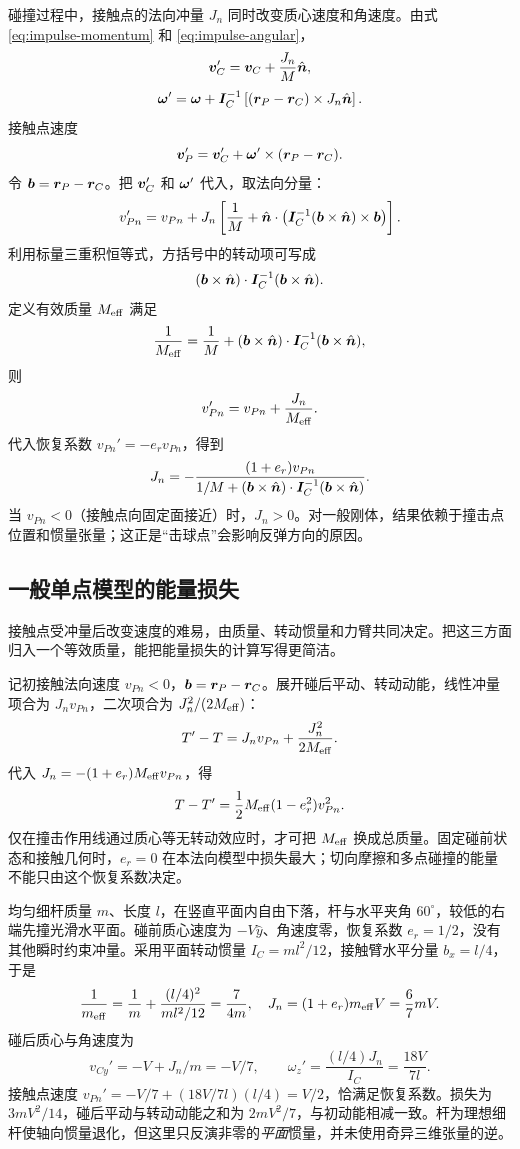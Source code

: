 碰撞过程中，接触点的法向冲量 \(J_n\) 同时改变质心速度和角速度。由式 \eqref{eq:impulse-momentum} 和 \eqref{eq:impulse-angular}，
\[
\boldsymbol{v}_C'=\boldsymbol{v}_C+\frac{J_n}{M}\hat{\boldsymbol{n}},
\]
\[
\boldsymbol{\omega}'=\boldsymbol{\omega}+\boldsymbol{I}_C^{-1}\left[(\boldsymbol{r}_P-\boldsymbol{r}_C)\times J_n\hat{\boldsymbol{n}}\right].
\]
接触点速度
\[
\boldsymbol{v}_P'=\boldsymbol{v}_C'+\boldsymbol{\omega}'\times(\boldsymbol{r}_P-\boldsymbol{r}_C).
\]
令 \(\boldsymbol{b}=\boldsymbol{r}_P-\boldsymbol{r}_C\)。把 \(\boldsymbol{v}_C'\) 和 \(\boldsymbol{\omega}'\) 代入，取法向分量：
\[
v_{Pn}'=v_{Pn}+J_n\left[
\frac1M+\hat{\boldsymbol{n}}\cdot
\left(\boldsymbol{I}_C^{-1}(\boldsymbol{b}\times\hat{\boldsymbol{n}})\times\boldsymbol{b}\right)
\right].
\]
利用标量三重积恒等式，方括号中的转动项可写成
\[
(\boldsymbol{b}\times\hat{\boldsymbol{n}})\cdot
\boldsymbol{I}_C^{-1}(\boldsymbol{b}\times\hat{\boldsymbol{n}}).
\]
定义有效质量 \(M_{\rm eff}\) 满足
\[
\frac1{M_{\rm eff}}
=\frac1M
+(\boldsymbol{b}\times\hat{\boldsymbol{n}})\cdot
\boldsymbol{I}_C^{-1}(\boldsymbol{b}\times\hat{\boldsymbol{n}}),
\]
则
\[
v_{Pn}'=v_{Pn}+\frac{J_n}{M_{\rm eff}}.
\]
代入恢复系数 \(v_{Pn}'=-e_r v_{Pn}\)，得到
\begin{equation}
J_n=-\frac{(1+e_r)v_{Pn}}{1/M
+(\boldsymbol{b}\times\hat{\boldsymbol{n}})\cdot
\boldsymbol{I}_C^{-1}(\boldsymbol{b}\times\hat{\boldsymbol{n}})}.
\label{eq:normal-impulse}
\end{equation}
当 \(v_{Pn}<0\)（接触点向固定面接近）时，\(J_n>0\)。对一般刚体，结果依赖于撞击点位置和惯量张量；这正是“击球点”会影响反弹方向的原因。

\subsection{一般单点模型的能量损失}
接触点受冲量后改变速度的难易，由质量、转动惯量和力臂共同决定。把这三方面归入一个等效质量，能把能量损失的计算写得更简洁。

记初接触法向速度 $v_{Pn}<0$，$\boldsymbol b=\boldsymbol{r}_P-\boldsymbol{r}_C$。展开碰后平动、转动动能，线性冲量项合为 $J_nv_{Pn}$，二次项合为 $J_n^2/(2M_{\rm eff})$：
\[
T'-T=J_nv_{Pn}+\frac{J_n^2}{2M_{\rm eff}}.
\]
代入 $J_n=-(1+e_r)M_{\rm eff}v_{Pn}$，得
\begin{equation}
T-T'=\frac12M_{\rm eff}(1-e_r^2)v_{Pn}^2.
\label{eq:collision-energy-loss}
\end{equation}
仅在撞击作用线通过质心等无转动效应时，才可把 $M_{\rm eff}$ 换成总质量。固定碰前状态和接触几何时，$e_r=0$ 在本法向模型中损失最大；切向摩擦和多点碰撞的能量不能只由这个恢复系数决定。

\begin{example}
均匀细杆质量 $m$、长度 $l$，在竖直平面内自由下落，杆与水平夹角 $60^\circ$，较低的右端先撞光滑水平面。碰前质心速度为 $-V\hat y$、角速度零，恢复系数 $e_r=1/2$，没有其他瞬时约束冲量。采用平面转动惯量 $I_C=ml^2/12$，接触臂水平分量 $b_x=l/4$，于是
\[
\frac1{m_{\rm eff}}=\frac1m+\frac{(l/4)^2}{ml^2/12}=\frac7{4m},\quad
J_n=(1+e_r)m_{\rm eff}V=\frac67mV.
\]
碰后质心与角速度为
\[
v_{Cy}'=-V+J_n/m=-V/7,\qquad
\omega_z'=\frac{(l/4)J_n}{I_C}=\frac{18V}{7l}.
\]
接触点速度 $v_{Pn}'=-V/7+(18V/7l)(l/4)=V/2$，恰满足恢复系数。损失为 $3mV^2/14$，碰后平动与转动动能之和为 $2mV^2/7$，与初动能相减一致。杆为理想细杆使轴向惯量退化，但这里只反演非零的\emph{平面}惯量，并未使用奇异三维张量的逆。
\end{example}

